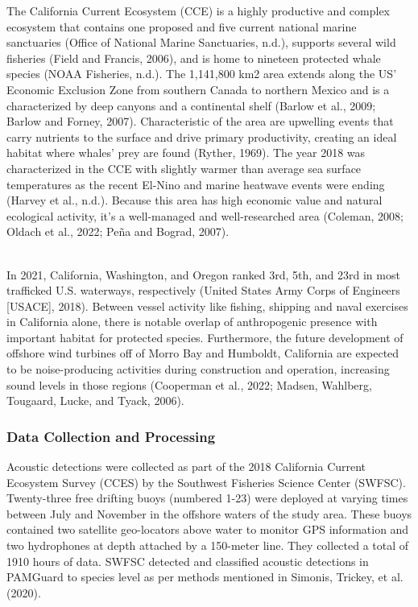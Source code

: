 \documentclass[
]{article}
\begin{document}
The California Current Ecosystem (CCE) is a highly productive and
complex ecosystem that contains one proposed and five current national
marine sanctuaries (Office of National Marine Sanctuaries, n.d.),
supports several wild fisheries (Field and Francis, 2006), and is home
to nineteen protected whale species (NOAA Fisheries, n.d.). The
1,141,800 km2 area extends along the US' Economic Exclusion Zone from
southern Canada to northern Mexico and is a characterized by deep
canyons and a continental shelf (Barlow et al., 2009; Barlow and Forney,
2007). Characteristic of the area are upwelling events that carry
nutrients to the surface and drive primary productivity, creating an
ideal habitat where whales' prey are found (Ryther, 1969). The year 2018
was characterized in the CCE with slightly warmer than average sea
surface temperatures as the recent El-Nino and marine heatwave events
were ending (Harvey et al., n.d.). Because this area has high economic
value and natural ecological activity, it's a well-managed and
well-researched area (Coleman, 2008; Oldach et al., 2022; Peña and
Bograd, 2007).\\
\strut \\
In 2021, California, Washington, and Oregon ranked 3rd, 5th, and 23rd in
most trafficked U.S. waterways, respectively (United States Army Corps
of Engineers {[}USACE{]}, 2018). Between vessel activity like fishing,
shipping and naval exercises in California alone, there is notable
overlap of anthropogenic presence with important habitat for protected
species. Furthermore, the future development of offshore wind turbines
off of Morro Bay and Humboldt, California are expected to be
noise-producing activities during construction and operation, increasing
sound levels in those regions (Cooperman et al., 2022; Madsen, Wahlberg,
Tougaard, Lucke, and Tyack, 2006).

\hypertarget{data-collection-and-processing}{%
\subsubsection{Data Collection and
Processing}\label{data-collection-and-processing}}

Acoustic detections were collected as part of the 2018 California
Current Ecosystem Survey (CCES) by the Southwest Fisheries Science
Center (SWFSC). Twenty-three free drifting buoys (numbered 1-23) were
deployed at varying times between July and November in the offshore
waters of the study area. These buoys contained two satellite
geo-locators above water to monitor GPS information and two hydrophones
at depth attached by a 150-meter line. They collected a total of 1910
hours of data. SWFSC detected and classified acoustic detections in
PAMGuard to species level as per methods mentioned in Simonis, Trickey,
et al. (2020).
\end{document}
